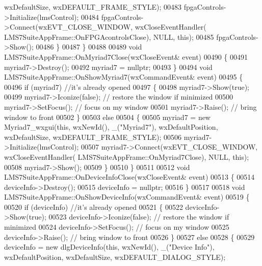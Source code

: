 \begin{DoxyCode}
{{{{      wxDefaultSize, wxDEFAULT\_FRAME\_STYLE);
00483         fpgaControls->Initialize(lmsControl);
00484         fpgaControls->Connect(wxEVT\_CLOSE\_WINDOW, wxCloseEventHandler(
      LMS7SuiteAppFrame::OnFPGAcontrolsClose), NULL, \textcolor{keyword}{this});
00485         fpgaControls->Show();
00486     \}
00487 \}
00488 
00489 \textcolor{keywordtype}{void} LMS7SuiteAppFrame::OnMyriad7Close(wxCloseEvent& event)
00490 \{
00491     myriad7->Destroy();
00492     myriad7 = \textcolor{keyword}{nullptr};
00493 \}
00494 \textcolor{keywordtype}{void} LMS7SuiteAppFrame::OnShowMyriad7(wxCommandEvent& event)
00495 \{
00496     \textcolor{keywordflow}{if} (myriad7) \textcolor{comment}{//it's already opened}
00497     \{
00498         myriad7->Show(\textcolor{keyword}{true});
00499         myriad7->Iconize(\textcolor{keyword}{false}); \textcolor{comment}{// restore the window if minimized}
00500         myriad7->SetFocus();  \textcolor{comment}{// focus on my window}
00501         myriad7->Raise();  \textcolor{comment}{// bring window to front}
00502     \}
00503     \textcolor{keywordflow}{else}
00504     \{
00505         myriad7 = \textcolor{keyword}{new} Myriad7_wxgui(\textcolor{keyword}{this}, wxNewId(), \_(\textcolor{stringliteral}{"Myriad7"}), wxDefaultPosition, wxDefaultSize, 
      wxDEFAULT\_FRAME\_STYLE);
00506         myriad7->Initialize(lmsControl);
00507         myriad7->Connect(wxEVT\_CLOSE\_WINDOW, wxCloseEventHandler(
      LMS7SuiteAppFrame::OnMyriad7Close), NULL, \textcolor{keyword}{this});
00508         myriad7->Show();
00509     \}
00510 \}
00511 
00512 \textcolor{keywordtype}{void} LMS7SuiteAppFrame::OnDeviceInfoClose(wxCloseEvent& event)
00513 \{
00514     deviceInfo->Destroy();
00515     deviceInfo = \textcolor{keyword}{nullptr};
00516 \}
00517 
00518 \textcolor{keywordtype}{void} LMS7SuiteAppFrame::OnShowDeviceInfo(wxCommandEvent& event)
00519 \{
00520     \textcolor{keywordflow}{if} (deviceInfo) \textcolor{comment}{//it's already opened}
00521     \{
00522         deviceInfo->Show(\textcolor{keyword}{true});
00523         deviceInfo->Iconize(\textcolor{keyword}{false}); \textcolor{comment}{// restore the window if minimized}
00524         deviceInfo->SetFocus();  \textcolor{comment}{// focus on my window}
00525         deviceInfo->Raise();  \textcolor{comment}{// bring window to front}
00526     \}
00527     \textcolor{keywordflow}{else}
00528     \{
00529         deviceInfo = \textcolor{keyword}{new} dlgDeviceInfo(\textcolor{keyword}{this}, wxNewId(), \_(\textcolor{stringliteral}{"Device Info"}), wxDefaultPosition, wxDefaultSize,
       wxDEFAULT\_DIALOG\_STYLE);
}}}}
\end{DoxyCode}
